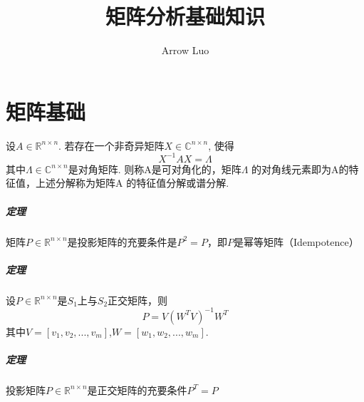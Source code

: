 \documentclass[UTF8]{article}
\author{Arrow Luo}
\title{矩阵分析基础知识}
\begin{document}
\maketitle

\section{矩阵基础}

\begin{flushleft}
    设$A\in\mathbb{R}^{n \times n}$. 若存在一个非奇异矩阵$X\in\mathbb{C}^{n \times n}$, 使得
    $$X^{-1}AX=\Lambda$$
    其中$\Lambda \in \mathbb{C}^{n \times n}$是对角矩阵. 则称A是可对角化的，矩阵$\Lambda$ 的对角线元素即为A的特征值，上述分解称为矩阵A 的特征值分解或谱分解.

    \subparagraph{定理}
    矩阵$P\in\mathbb{R}^{n \times n}$是投影矩阵的充要条件是$P^2=P$，即$P$是\textcolor[rgb]{0.20,0.16,0.98}{幂等矩阵（Idempotence）}

    \subparagraph{定理}
    设$P\in\mathbb{R}^{n \times n}$是$S_{1}$上与$S_2$正交矩阵，则
    $$P=V(W^TV)^{-1}W^T$$
    其中$V=[v_1,v_2,...,v_m]$,$W=[w_1,w_2,...,w_m]$.

    \subparagraph{定理}
    投影矩阵$P\in\mathbb{R}^{n \times n}$是正交矩阵的充要条件$P^T=P$

\end{flushleft}
\end{document}
